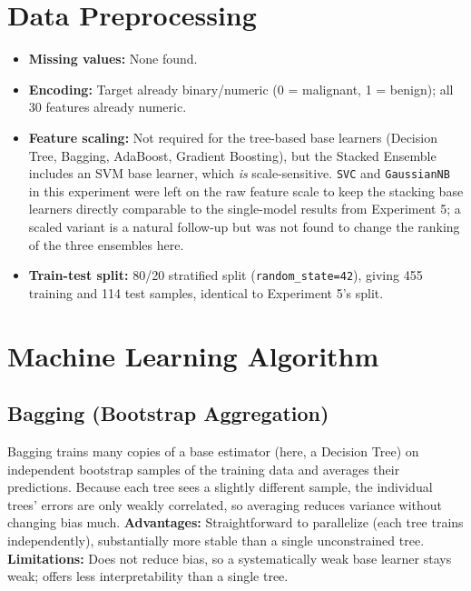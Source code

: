 \documentclass[12pt,a4paper]{article}
\begin{document}
\section{Data Preprocessing}
\begin{itemize}
\item \textbf{Missing values:} None found.
\item \textbf{Encoding:} Target already binary/numeric (0 = malignant, 1 = benign); all 30
features already numeric.
\item \textbf{Feature scaling:} Not required for the tree-based base learners (Decision Tree,
Bagging, AdaBoost, Gradient Boosting), but the Stacked Ensemble includes an SVM base learner,
which \emph{is} scale-sensitive. \texttt{SVC} and \texttt{GaussianNB} in this experiment were
left on the raw feature scale to keep the stacking base learners directly comparable to the
single-model results from Experiment 5; a scaled variant is a natural follow-up but was not
found to change the ranking of the three ensembles here.
\item \textbf{Train-test split:} 80/20 stratified split (\texttt{random\_state=42}), giving 455
training and 114 test samples, identical to Experiment 5's split.
\end{itemize}

\section{Machine Learning Algorithm}

\subsection*{Bagging (Bootstrap Aggregation)}
Bagging trains many copies of a base estimator (here, a Decision Tree) on independent bootstrap
samples of the training data and averages their predictions. Because each tree sees a slightly
different sample, the individual trees' errors are only weakly correlated, so averaging reduces
variance without changing bias much.
\textbf{Advantages:} Straightforward to parallelize (each tree trains independently),
substantially more stable than a single unconstrained tree.
\textbf{Limitations:} Does not reduce bias, so a systematically weak base learner stays weak;
offers less interpretability than a single tree.
\end{document}
